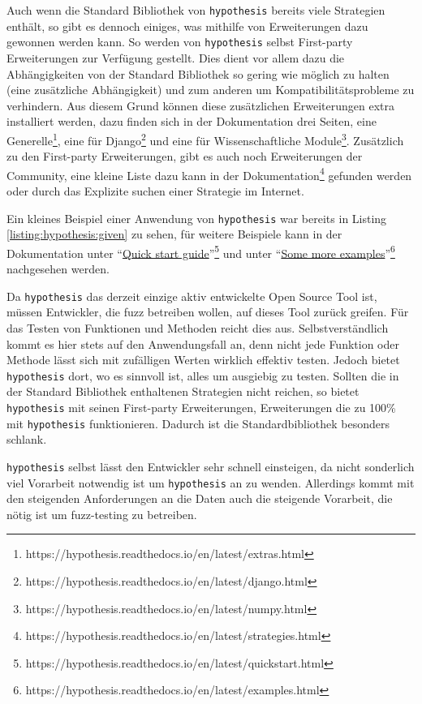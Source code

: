 Auch wenn die Standard Bibliothek von \lstinline{hypothesis} bereits viele 
Strategien enthält, so gibt es dennoch einiges, was mithilfe von Erweiterungen 
dazu gewonnen werden kann. So werden von \lstinline{hypothesis} selbst 
First-party Erweiterungen zur Verfügung gestellt. Dies dient vor allem dazu die 
Abhängigkeiten von der Standard Bibliothek so gering wie möglich zu halten 
(eine zusätzliche Abhängigkeit) und zum anderen um Kompatibilitätsprobleme zu 
verhindern. Aus diesem Grund können diese zusätzlichen Erweiterungen extra 
installiert werden, dazu finden sich in der Dokumentation drei Seiten, eine 
Generelle\footnote{https://hypothesis.readthedocs.io/en/latest/extras.html}, 
eine für 
Django\footnote{https://hypothesis.readthedocs.io/en/latest/django.html} und 
eine für Wissenschaftliche 
Module\footnote{https://hypothesis.readthedocs.io/en/latest/numpy.html}.
Zusätzlich zu den First-party Erweiterungen, gibt es auch noch Erweiterungen 
der Community, eine kleine Liste dazu kann in der  
Dokumentation\footnote{https://hypothesis.readthedocs.io/en/latest/strategies.html}
gefunden werden oder durch das Explizite suchen einer Strategie im Internet.

Ein kleines Beispiel einer Anwendung von \lstinline{hypothesis} war bereits in 
Listing \ref{listing:hypothesis:given} zu sehen, für weitere Beispiele kann in 
der Dokumentation unter
"`\href{https://hypothesis.readthedocs.io/en/latest/quickstart.html}{Quick
start
guide}"'\footnote{https://hypothesis.readthedocs.io/en/latest/quickstart.html}
und unter
"`\href{https://hypothesis.readthedocs.io/en/latest/examples.html}{Some more
examples}"'\footnote{https://hypothesis.readthedocs.io/en/latest/examples.html}
nachgesehen werden.

Da \lstinline{hypothesis} das derzeit einzige aktiv entwickelte Open Source 
Tool ist, müssen Entwickler, die \gls{fuzz} betreiben wollen, auf dieses Tool 
zurück greifen. Für das Testen von Funktionen und Methoden reicht dies aus. 
Selbstverständlich kommt es hier stets auf den Anwendungsfall an, denn nicht 
jede Funktion oder Methode lässt sich mit zufälligen Werten wirklich effektiv 
testen. Jedoch bietet \lstinline{hypothesis} dort, wo es sinnvoll ist, alles
um ausgiebig zu testen. Sollten die in der Standard Bibliothek enthaltenen 
Strategien nicht reichen, so bietet \lstinline{hypothesis} mit seinen 
First-party Erweiterungen, Erweiterungen die zu 100\% mit 
\lstinline{hypothesis} funktionieren. Dadurch ist die Standardbibliothek 
besonders schlank.

\lstinline{hypothesis} selbst lässt den Entwickler sehr schnell einsteigen, da
nicht sonderlich viel Vorarbeit notwendig ist um \lstinline{hypothesis} an zu
wenden. Allerdings kommt mit den steigenden Anforderungen an die Daten auch die
steigende Vorarbeit, die nötig ist um \gls{fuzz}-testing zu betreiben.

